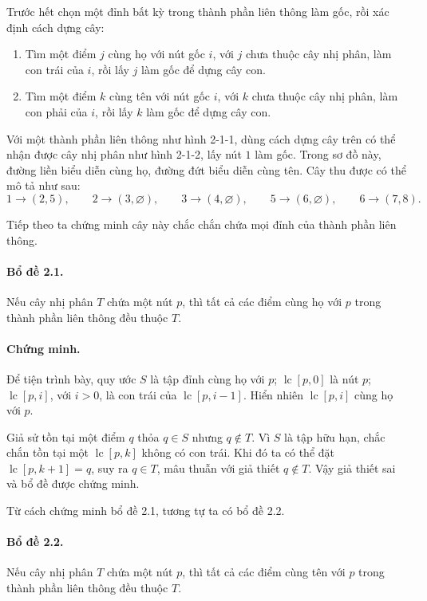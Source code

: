 \documentclass[11pt]{article}
\begin{document}
Trước hết chọn một đỉnh bất kỳ trong thành phần liên thông làm gốc, rồi xác
định cách dựng cây:
\begin{enumerate}
  \item Tìm một điểm \(j\) cùng họ với nút gốc \(i\), với \(j\) chưa thuộc
  cây nhị phân, làm con trái của \(i\), rồi lấy \(j\) làm gốc để dựng cây con.
  \item Tìm một điểm \(k\) cùng tên với nút gốc \(i\), với \(k\) chưa thuộc
  cây nhị phân, làm con phải của \(i\), rồi lấy \(k\) làm gốc để dựng cây con.
\end{enumerate}

Với một thành phần liên thông như hình 2-1-1, dùng cách dựng cây trên có thể
nhận được cây nhị phân như hình 2-1-2, lấy nút \(1\) làm gốc. Trong sơ đồ này,
đường liền biểu diễn cùng họ, đường đứt biểu diễn cùng tên. Cây thu được có
thể mô tả như sau:
\[
  1\to(2,5),\qquad 2\to(3,\varnothing),\qquad
  3\to(4,\varnothing),\qquad 5\to(6,\varnothing),\qquad
  6\to(7,8).
\]

Tiếp theo ta chứng minh cây này chắc chắn chứa mọi đỉnh của thành phần liên
thông.

\paragraph{Bổ đề 2.1.}
Nếu cây nhị phân \(T\) chứa một nút \(p\), thì tất cả các điểm cùng họ với
\(p\) trong thành phần liên thông đều thuộc \(T\).

\paragraph{Chứng minh.}
Để tiện trình bày, quy ước \(S\) là tập đỉnh cùng họ với \(p\);
\(\operatorname{lc}[p,0]\) là nút \(p\);
\(\operatorname{lc}[p,i]\), với \(i>0\), là con trái của
\(\operatorname{lc}[p,i-1]\). Hiển nhiên \(\operatorname{lc}[p,i]\) cùng họ
với \(p\).

Giả sử tồn tại một điểm \(q\) thỏa \(q\in S\) nhưng \(q\notin T\). Vì \(S\) là
tập hữu hạn, chắc chắn tồn tại một \(\operatorname{lc}[p,k]\) không có con
trái. Khi đó ta có thể đặt \(\operatorname{lc}[p,k+1]=q\), suy ra \(q\in T\),
mâu thuẫn với giả thiết \(q\notin T\). Vậy giả thiết sai và bổ đề được chứng
minh.

Từ cách chứng minh bổ đề 2.1, tương tự ta có bổ đề 2.2.

\paragraph{Bổ đề 2.2.}
Nếu cây nhị phân \(T\) chứa một nút \(p\), thì tất cả các điểm cùng tên với
\(p\) trong thành phần liên thông đều thuộc \(T\).
\end{document}
